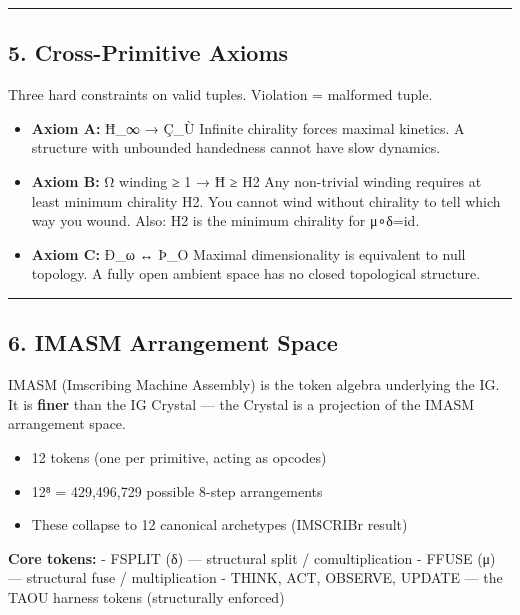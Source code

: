 \documentclass[12pt,a4paper]{article}
\begin{document}
\begin{center}\rule{0.5\linewidth}{0.5pt}\end{center}

\hypertarget{cross-primitive-axioms}{%
\subsection{5. Cross-Primitive Axioms}\label{cross-primitive-axioms}}

Three hard constraints on valid tuples. Violation = malformed tuple.

\begin{itemize}
\item
  \textbf{Axiom A:} Ħ\_∞ → Ç\_Ù Infinite chirality forces maximal
  kinetics. A structure with unbounded handedness cannot have slow
  dynamics.
\item
  \textbf{Axiom B:} Ω winding ≥ 1 → Ħ ≥ H2 Any non-trivial winding
  requires at least minimum chirality H2. You cannot wind without
  chirality to tell which way you wound. Also: H2 is the minimum
  chirality for μ∘δ=id.
\item
  \textbf{Axiom C:} Ð\_ω ↔ Þ\_O Maximal dimensionality is equivalent to
  null topology. A fully open ambient space has no closed topological
  structure.
\end{itemize}

\begin{center}\rule{0.5\linewidth}{0.5pt}\end{center}

\hypertarget{imasm-arrangement-space}{%
\subsection{6. IMASM Arrangement Space}\label{imasm-arrangement-space}}

IMASM (Imscribing Machine Assembly) is the token algebra underlying the
IG. It is \textbf{finer} than the IG Crystal --- the Crystal is a
projection of the IMASM arrangement space.

\begin{itemize}
\tightlist
\item
  12 tokens (one per primitive, acting as opcodes)
\item
  12⁸ = 429,496,729 possible 8-step arrangements
\item
  These collapse to 12 canonical archetypes (IMSCRIBr result)
\end{itemize}

\textbf{Core tokens:} - FSPLIT (δ) --- structural split /
comultiplication - FFUSE (μ) --- structural fuse / multiplication -
THINK, ACT, OBSERVE, UPDATE --- the TAOU harness tokens (structurally
enforced)
\end{document}
